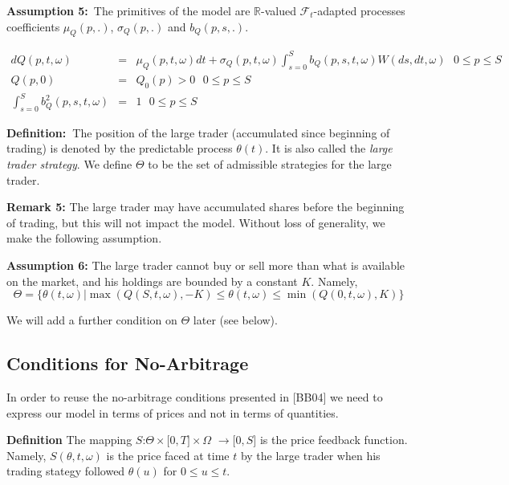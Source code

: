 \documentclass{article}
\begin{document}
\textbf{Assumption 5:}\ The primitives of the model are $\mathbb{R}$-valued $%
\mathcal{F}_{t}$-adapted processes coefficients $\mu _{Q}(p,.)$, $\sigma
_{Q}(p,.)$ and $b_{Q}(p,s,.)$.

\begin{eqnarray}
dQ(p,t,\omega ) &=&\mu _{Q}(p,t,\omega )dt+\sigma _{Q}(p,t,\omega
)\int_{s=0}^{S}b_{Q}(p,s,t,\omega )W(ds,dt,\omega )\text{ \ \ \ }0\leq p\leq
S  \label{GenMod1} \\
Q(p,0) &=&Q_{0}(p)>0\text{ \ \ \ \ \ \ \ \ }0\leq p\leq S  \label{GenMod2} \\
\int_{s=0}^{S}b_{Q}^{2}(p,s,t,\omega ) &=&1\text{ \ \ \ \ \ \ \ \ }0\leq
p\leq S  \label{GenMod3}
\end{eqnarray}%
\bigskip

\textbf{Definition:\ }The position of the large trader (accumulated since
beginning of trading) is denoted by the predictable process $\theta (t)$. It
is also called the \textit{large trader strategy}. We define $\Theta $ to be
the set of admissible strategies for the large trader.

\bigskip

\textbf{Remark 5:} The large trader may have accumulated shares before the
beginning of trading, but this will not impact the model. Without loss of
generality, we make the following assumption.

\bigskip

\textbf{Assumption 6: }The large trader cannot buy or sell more than what is
available on the market, and his holdings are bounded by a constant $K$.
Namely,%
\begin{equation*}
\Theta =\{\theta (t,\omega )|\max (Q(S,t,\omega ),-K)\leq \theta (t,\omega
)\leq \min (Q(0,t,\omega ),K)\}
\end{equation*}

We will add a further condition on $\Theta $ later (see below).

\bigskip

\subsection{Conditions for No-Arbitrage}

In order to reuse the no-arbitrage conditions presented in [BB04] we need to
express our model in terms of prices and not in terms of quantities.

\bigskip

\textbf{Definition }The mapping $S$:$\Theta \times \lbrack 0,T]\times \Omega 
$ $\rightarrow \lbrack 0,S]$ is the price feedback function. Namely, $%
S(\theta ,t,\omega )$ is the price faced at time $t$ by the large trader
when his trading stategy followed $\theta (u)$ for $0\leq u\leq t.$
\end{document}
